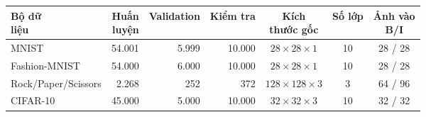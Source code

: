 \begin{tabular}{lrrrccc}
\toprule
\makecell[l]{Bộ dữ\\liệu} & \makecell[r]{Huấn\\luyện} & Validation & Kiểm tra & \makecell[c]{Kích\\thước gốc} & Số lớp & \makecell[c]{Ảnh vào\\B/I} \\
\midrule
MNIST & 54{.}001 & 5{.}999 & 10{.}000 & $28\times28\times1$ & 10 & 28 / 28 \\
Fashion-MNIST & 54{.}000 & 6{.}000 & 10{.}000 & $28\times28\times1$ & 10 & 28 / 28 \\
Rock/Paper/Scissors & 2{.}268 & 252 & 372 & $128\times128\times3$ & 3 & 64 / 96 \\
CIFAR-10 & 45{.}000 & 5{.}000 & 10{.}000 & $32\times32\times3$ & 10 & 32 / 32 \\
\bottomrule
\end{tabular}

